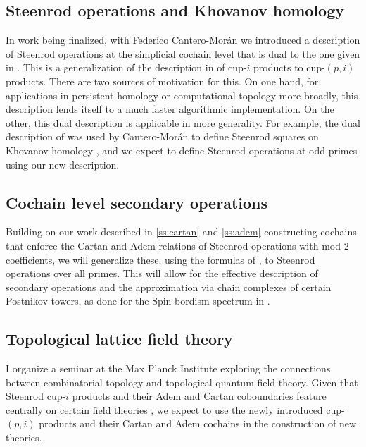 \subsection{Steenrod operations and Khovanov homology}

In work being finalized, with Federico Cantero-Mor\'{a}n we introduced a description of Steenrod operations at the simplicial cochain level that is dual to the one given in \cite{medina2020maysteenrod}.
This is a generalization of the description in \cite{medina2021newformulas} of cup-$i$ products to cup-$(p,i)$ products.
There are two sources of motivation for this.
On one hand, for applications in persistent homology or computational topology more broadly, this description lends itself to a much faster algorithmic implementation.
On the other, this dual description is applicable in more generality.
For example, the dual description of \cite{medina2021newformulas} was used by Cantero-Mor\'{a}n to define Steenrod squares on Khovanov homology \cite{cantero-moran2020khovanov}, and we expect to define Steenrod operations at odd primes using our new description.

\subsection{Cochain level secondary operations}

Building on our work described in \cref{ss:cartan} and \cref{ss:adem} constructing cochains that enforce the Cartan and Adem relations of Steenrod operations with mod $2$ coefficients, we will generalize these, using the formulas of \cite{medina2020maysteenrod}, to Steenrod operations over all primes.
This will allow for the effective description of secondary operations and the approximation via chain complexes of certain Postnikov towers, as done for the Spin bordism spectrum in \cite{brumfiel2016pontrjagin, brumfiel2018pontrjagin}.

\subsection{Topological lattice field theory}

I organize a seminar at the Max Planck Institute exploring the connections between combinatorial topology and topological quantum field theory.
Given that Steenrod \mbox{cup-$i$} products and their Adem and Cartan coboundaries feature centrally on certain field theories \cite{gaiotto2016spin, kapustin2017fermionic, barkeshli2021classification}, we expect to use the newly introduced cup-$(p,i)$ products and their Cartan and Adem cochains in the construction of new theories.

